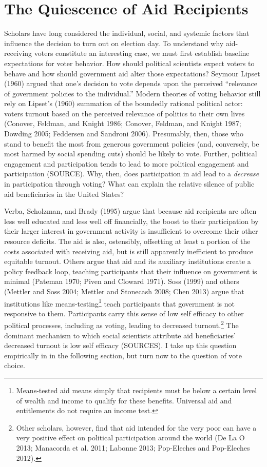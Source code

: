 \documentclass[12pt]{paper}
\begin{document}
\section{The Quiescence of Aid Recipients}
Scholars have long considered the individual, social, and systemic factors that influence the decision to turn out on election day. To understand why aid-receiving voters constitute an interesting case, we must first establish baseline expectations for voter behavior. How should political scientists expect voters to behave and how should government aid alter those expectations?  Seymour Lipset (1960) argued that one's decision to vote depends upon the perceived “relevance of government policies to the individual.” Modern theories of voting behavior still rely on Lipset’s (1960) summation of the boundedly rational political actor: voters turnout based on the perceived relevance of politics to their own lives (Conover, Feldman, and Knight 1986; Conover, Feldman, and Knight 1987; Dowding 2005; Feddersen and Sandroni 2006). Presumably, then, those who stand to benefit the most from generous government policies (and, conversely, be most harmed by social spending cuts) should be likely to vote. Further, political engagement and participation tends to lead to more political engagement and participation (SOURCE). Why, then, does participation in aid lead to a \textit{decrease} in participation through voting? What can explain the relative silence of public aid beneficiaries in the United States?

Verba, Scholzman, and Brady (1995) argue that because aid recipients are often less well educated and less well off financially, the boost to their participation by their larger interest in government activity is insufficient to overcome their other resource deficits. The aid is also, ostensibly, offsetting at least a portion of the costs associated with receiving aid, but is still apparently inefficient to produce equitable turnout. Others argue that aid and its auxiliary institutions create a policy feedback loop, teaching participants that their influence on government is minimal (Pateman 1970; Piven and Cloward 1971). Soss (1999) and others (Mettler and Soss 2004; Mettler and Stonecash 2008; Chen 2013) argue that institutions like means-testing\footnote{Means-tested aid means simply that recipients must be below a certain level of wealth and income to qualify for these benefits. Universal aid and entitlements do not require an income test.} teach participants that government is not responsive to them. Participants carry this sense of low self efficacy to other political processes, including as voting, leading to decreased turnout.\footnote{Other scholars, however, find that aid intended for the very poor can have a very positive effect on political participation around the world (De La O 2013; Manacorda et al. 2011; Labonne 2013; Pop-Eleches and Pop-Eleches 2012).} The dominant mechanism to which social scientists attribute aid beneficiaries' decreased turnout is low self efficacy (SOURCES). I take up this question empirically in in the following section, but turn now to the question of vote choice.
\end{document}
